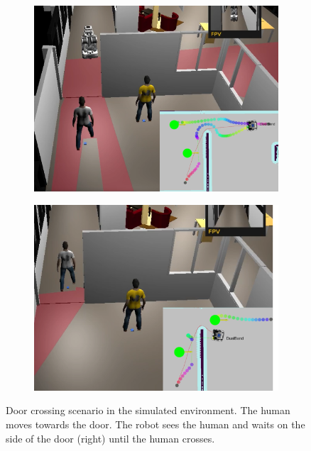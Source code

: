 \begin{figure}[h!]
\centering
\begin{subfigure}{.45\columnwidth}
  \includegraphics[width=\textwidth]{images/chapter4/door_1}
\end{subfigure}
\hspace{-0.25cm}
\begin{subfigure}{.45\columnwidth}
  \includegraphics[width=\textwidth]{images/chapter4/door_2} 
\end{subfigure}
\caption{Door crossing scenario in the simulated environment. The human moves towards the door. The robot sees the human and waits on the side of the door (right) until the human crosses.}
\label{fig:door_cross_scene}
\end{figure}
